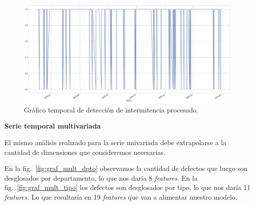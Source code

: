 \documentclass[a4paper,12pt]{article}
\begin{document}
		\begin{figure}[H]
			\begin{center}
				\includegraphics[width=1\textwidth]{tesis_81.png}
				\caption{Gráfico temporal de detección de intermitencia  procesado.}
				\label{fig:graf_inter_desp}
			\end{center}
		\end{figure}
				
		\textbf{Serie temporal multivariada}
				
		El mismo análisis realizado para la serie univariada debe extrapolarse a la cantidad de dimensiones que consideremos necesarias. 
				
		En la fig.~\ref{fig:graf_mult_dpto} observamos la cantidad de defectos que luego son desglosados por departamento, lo que nos daría 8 \textit{features}. En la fig.~\ref{fig:graf_mult_tipo} los defectos son desglosados por tipo, lo que nos daría 11 \textit{features}. Lo que resultaría en 19 \textit{features} que van a alimentar nuestro modelo.
				
\end{document}
